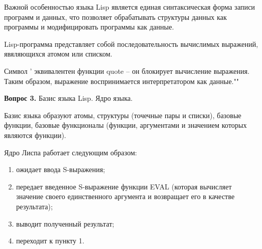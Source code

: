 Важной особенностью языка Lisp является единая синтаксическая форма записи программ и данных, что позволяет обрабатывать структуры данных как программы и модифицировать программы как данные. 

Lisp-программа представляет собой последовательность вычислимых выражений, явяляющихся атомом или списком.

Символ ' эквивалентен функции quote – он блокирует вычисление выражения. Таким образом, выражение воспринимается интерпретатором как данные.""\newline

\textbf{Вопрос 3.} Базис языка Lisp. Ядро языка. \newline

Базис языка образуют атомы, структуры (точечные пары и списки), базовые функции, базовые функционалы (функции, аргументами и значением которых являются функции).

Ядро Лиспа работает следующим образом: 
\begin{enumerate}
\item ожидает ввода S-выражения; 
\item передает введенное S-выражение функции EVAL (которая вычисляет значение своего единственного аргумента и возвращает его в качестве результата); 
\item выводит полученный результат;
\item переходит к пункту 1.
\end{enumerate}